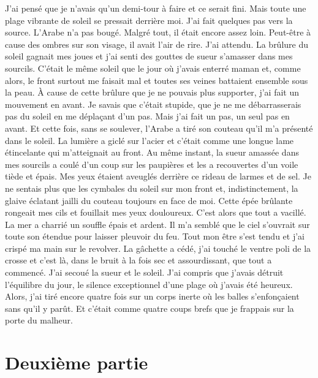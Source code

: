 \documentclass[french,twoside]{book} %
\newcommand\chapteropen{} %
\newcommand\chaptercont{} %
\newcommand\chapterclose{} %
\begin{document}
J'ai pensé que je n’avais qu’un demi-tour à faire et ce serait fini. Mais toute une plage vibrante de soleil se pressait derrière moi. J'ai fait quelques pas vers la source. L'Arabe n’a pas bougé. Malgré tout, il était encore assez loin. Peut-être à cause des ombres sur son visage, il avait l’air de rire. J'ai attendu. La brûlure du soleil gagnait mes joues et j’ai senti des gouttes de sueur s’amasser dans mes sourcils. C'était le même soleil que le jour où j’avais enterré maman et, comme alors, le front surtout me faisait mal et toutes ses veines battaient ensemble sous la peau. À cause de cette brûlure que je ne pouvais plus supporter, j’ai fait un mouvement en avant. Je savais que c’était stupide, que je ne me débarrasserais pas du soleil en me déplaçant d’un pas. Mais j’ai fait un pas, un seul pas en avant. Et cette fois, sans se soulever, l’Arabe a tiré son couteau qu’il m’a présenté dans le soleil. La lumière a giclé sur l’acier et c’était comme une longue lame étincelante qui m’atteignait au front. Au même instant, la sueur amassée dans mes sourcils a coulé d’un coup sur les paupières et les a recouvertes d’un voile tiède et épais. Mes yeux étaient aveuglés derrière ce rideau de larmes et de sel. Je ne sentais plus que les cymbales du soleil sur mon front et, indistinctement, la glaive éclatant jailli du couteau toujours en face de moi. Cette épée brûlante rongeait mes cils et fouillait mes yeux douloureux. C'est alors que tout a vacillé. La mer a charrié un souffle épais et ardent. Il m’a semblé que le ciel s’ouvrait sur toute son étendue pour laisser pleuvoir du feu. Tout mon être s’est tendu et j’ai crispé ma main sur le revolver. La gâchette a cédé, j’ai touché le ventre poli de la crosse et c’est là, dans le bruit à la fois sec et assourdissant, que tout a commencé. J'ai secoué la sueur et le soleil. J'ai compris que j’avais détruit l’équilibre du jour, le silence exceptionnel d’une plage où j’avais été heureux. Alors, j’ai tiré encore quatre fois sur un corps inerte où les balles s’enfonçaient sans qu’il y parût. Et c’était comme quatre coups brefs que je frappais sur la porte du malheur.
\chapterclose

\chapterclose


\chapteropen
\part[{Deuxième partie}]{Deuxième partie}
\label{II}\renewcommand{\leftmark}{Deuxième partie}


\chaptercont
\end{document}
